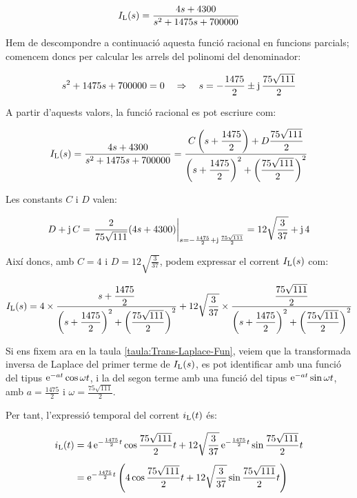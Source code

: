 \begin{exemple}
    \[
    I_\mathrm{L}(s) = \frac{4 s+ 4300}{s^2 +1475 s + 700000}
    \]

    Hem de descompondre a continuació aquesta funció racional en
    funcions parcials; comencem doncs per calcular les arrels del
    polinomi del denominador:

    \[
    s^2 +1475 s + 700000 = 0 \quad\Rightarrow\quad s= -\frac{1475}{2}
    \pm \mathrm{j}\,\frac{75\sqrt{111}}{2}
    \]

    A partir d'aquests valors, la  funció racional es pot escriure com:

    \[
        I_\mathrm{L}(s) =
        \frac{4 s+ 4300}{s^2 +1475 s + 700000} =
        \frac{C\left(s+\dfrac{1475}{2}\right)+D\dfrac{75\sqrt{111}}{2}}
        {\left(s+\dfrac{1475}{2}\right)^2+\left(\dfrac{75\sqrt{111}}{2}\right)^2}
    \]

    Les constants $C$ i $D$ valen:

    \[
    D + \mathrm{j}\,C = \left.\frac{2}{75\sqrt{111}}(4 s
    +4300)\right|_{s=-\frac{1475}{2} + \mathrm{j}\,\frac{75\sqrt{111}}{2}}=
    12\sqrt{\frac{3}{37}} +\mathrm{j}\,4
    \]

    Així doncs, amb $C=4$ i $D=12\sqrt{\frac{3}{37}}$, podem expressar
    el corrent $I_\mathrm{L}(s)$ com:

    \[
        I_\mathrm{L}(s) = 4\times\frac{s+\dfrac{1475}{2}}
        {\left(s+\dfrac{1475}{2}\right)^2+\left(\dfrac{75\sqrt{111}}{2}\right)^2}
        + 12\sqrt{\frac{3}{37}}\times\frac{\dfrac{75\sqrt{111}}{2}}
        {\left(s+\dfrac{1475}{2}\right)^2+\left(\dfrac{75\sqrt{111}}{2}\right)^2}
    \]


     Si ens fixem ara en la taula \vref{taula:Trans-Laplace-Fun},
    veiem que la transformada inversa de Laplace del primer terme de
    $I_\mathrm{L}(s)$, es pot identificar amb una funció del tipus
    $\mathrm{e}^{-at}\cos\omega t$, i la del segon terme amb una funció del tipus
    $\mathrm{e}^{-at}\sin\omega t$, amb $a=\frac{1475}{2}$ i
    $\omega=\frac{75\sqrt{111}}{2}$.

    Per tant, l'expressió temporal del corrent $i_\mathrm{L}(t)$ és:

    \[\begin{split}
        i_\mathrm{L}(t) &= 4\, \mathrm{e}^{-\frac{1475}{2}t} \cos \frac{75\sqrt{111}}{2} t +
        12\sqrt{\frac{3}{37}}\, \mathrm{e}^{-\frac{1475}{2}t} \sin
        \frac{75\sqrt{111}}{2}t  \\[1ex] &= \mathrm{e}^{-\frac{1475}{2}t} \left( 4
        \cos \frac{75\sqrt{111}}{2} t + 12\sqrt{\frac{3}{37}}\sin
        \frac{75\sqrt{111}}{2}t\right)
    \end{split}\]


\end{exemple}
